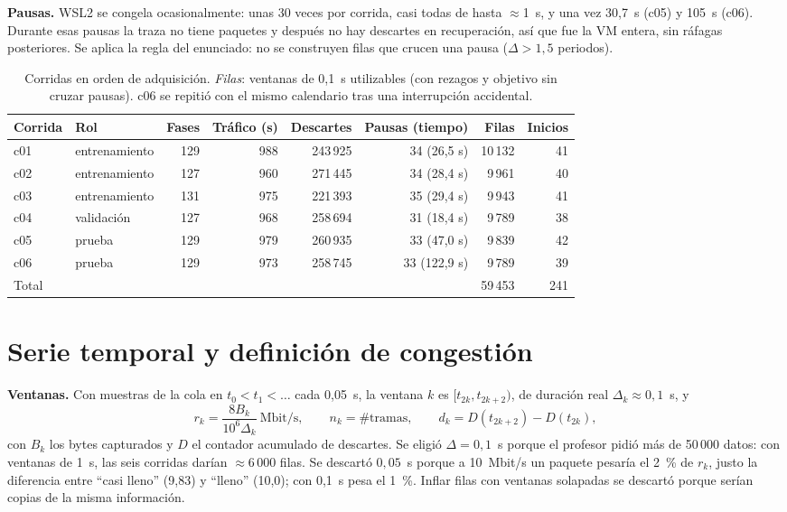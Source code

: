 \documentclass[11pt,a4paper]{article}
\begin{document}
\textbf{Pausas.} WSL2 se congela ocasionalmente: unas 30 veces por corrida, casi todas de
hasta $\approx$1~s, y una vez 30,7~s (c05) y 105~s (c06). Durante esas pausas la traza no tiene paquetes y después
no hay descartes en recuperación, así que fue la VM entera, sin ráfagas posteriores. Se
aplica la regla del enunciado: no se construyen filas que crucen una pausa ($\Delta>1{,}5$
periodos).

\begin{table}[!htb]
\centering\small
\begin{tabular}{llrrrrrr}
\toprule
Corrida & Rol & Fases & Tráfico (s) & Descartes & Pausas (tiempo) & Filas & Inicios\\
\midrule
c01 & entrenamiento & 129 & 988 & 243\,925 & 34 (26,5 s) & 10\,132 & 41\\
c02 & entrenamiento & 127 & 960 & 271\,445 & 34 (28,4 s) & 9\,961 & 40\\
c03 & entrenamiento & 131 & 975 & 221\,393 & 35 (29,4 s) & 9\,943 & 41\\
c04 & validación & 127 & 968 & 258\,694 & 31 (18,4 s) & 9\,789 & 38\\
c05 & prueba & 129 & 979 & 260\,935 & 33 (47,0 s) & 9\,839 & 42\\
c06 & prueba & 129 & 973 & 258\,745 & 33 (122,9 s) & 9\,789 & 39\\
\midrule
\multicolumn{6}{l}{Total} & 59\,453 & 241\\
\bottomrule
\end{tabular}
\caption{Corridas en orden de adquisición. \emph{Filas}: ventanas de 0,1~s utilizables (con rezagos y objetivo sin cruzar pausas). c06 se repitió con el mismo calendario tras una interrupción accidental.}
\label{tab:corridas}
\end{table}

\section{Serie temporal y definición de congestión}

\textbf{Ventanas.} Con muestras de la cola en $t_0<t_1<\dots$ cada 0,05~s, la ventana $k$ es
$[t_{2k},t_{2k+2})$, de duración real $\Delta_k\approx0{,}1$~s, y
\[
r_k=\frac{8B_k}{10^{6}\Delta_k}\ \text{Mbit/s},\qquad n_k=\#\text{tramas},\qquad
d_k=D(t_{2k+2})-D(t_{2k}),
\]
con $B_k$ los bytes capturados y $D$ el contador acumulado de descartes. Se eligió
$\Delta=0{,}1$~s porque el profesor pidió más de 50\,000 datos: con ventanas de 1~s, las
seis corridas darían $\approx$6\,000 filas. Se descartó $0{,}05$~s porque a 10~Mbit/s un paquete
pesaría el 2~\% de $r_k$, justo la diferencia entre ``casi lleno'' (9,83) y ``lleno''
(10,0); con 0,1~s pesa el 1~\%. Inflar filas con ventanas solapadas se descartó porque
serían copias de la misma información.
\end{document}
